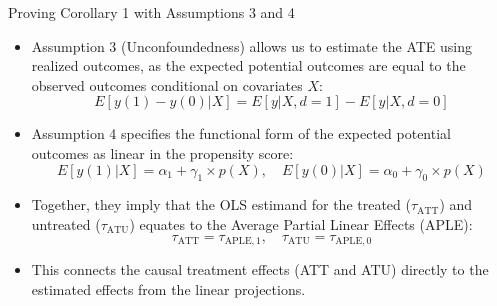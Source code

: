 \begin{frame}[shrink]{Proving Corollary 1 with Assumptions 3 and 4}
  \begin{itemize}
    \item Assumption 3 (Unconfoundedness) allows us to estimate the ATE using realized outcomes, as the expected potential outcomes are equal to the observed outcomes conditional on covariates \( X \):
    \[ E[y(1) - y(0) | X] = E[y | X, d = 1] - E[y | X, d = 0] \]
    \item Assumption 4 specifies the functional form of the expected potential outcomes as linear in the propensity score:
    \[ E[y(1) | X] = \alpha_1 + \gamma_1 \times p(X), \quad E[y(0) | X] = \alpha_0 + \gamma_0 \times p(X) \]
    \item Together, they imply that the OLS estimand for the treated (\( \tau_{\text{ATT}} \)) and untreated (\( \tau_{\text{ATU}} \)) equates to the Average Partial Linear Effects (APLE):
    \[ \tau_{\text{ATT}} = \tau_{\text{APLE},1}, \quad \tau_{\text{ATU}} = \tau_{\text{APLE},0} \]
    \item This connects the causal treatment effects (ATT and ATU) directly to the estimated effects from the linear projections.
  \end{itemize}
\end{frame}
